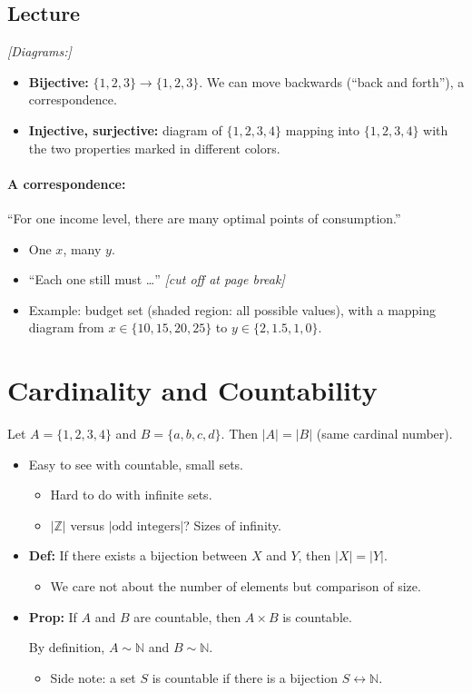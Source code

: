 \documentclass[11pt]{article}
\newcommand{\note}[1]{\textcolor{red!60!black}{\textit{[#1]}}}
\newcommand{\N}{\mathbb{N}}
\newcommand{\Z}{\mathbb{Z}}
\begin{document}
\subsection*{Lecture}
\note{Diagrams:}
\begin{itemize}
  \item \textbf{Bijective:} $\{1,2,3\} \to \{1,2,3\}$. We can move backwards (``back and forth''), a correspondence.
  \item \textbf{Injective, surjective:} diagram of $\{1,2,3,4\}$ mapping into $\{1,2,3,4\}$ with the two properties marked in different colors.
\end{itemize}

\paragraph{A correspondence:} ``For one income level, there are many optimal points of consumption.''
\begin{itemize}
  \item One $x$, many $y$.
  \item ``Each one still must \ldots'' \note{cut off at page break}
  \item Example: budget set (shaded region: all possible values), with a mapping diagram from $x \in \{10, 15, 20, 25\}$ to $y \in \{2, 1.5, 1, 0\}$.
\end{itemize}

\section{Cardinality and Countability}

Let $A = \{1,2,3,4\}$ and $B = \{a,b,c,d\}$. Then $|A| = |B|$ (same cardinal number).

\begin{itemize}
  \item Easy to see with countable, small sets.
  \begin{itemize}
    \item Hard to do with infinite sets.
    \item $|\Z|$ versus $|\text{odd integers}|$? Sizes of infinity.
  \end{itemize}
  \item \textbf{Def:} If there exists a bijection between $X$ and $Y$, then $|X| = |Y|$.
  \begin{itemize}
    \item We care not about the number of elements but comparison of size.
  \end{itemize}
  \item \textbf{Prop:} If $A$ and $B$ are countable, then $A \times B$ is countable.

  By definition, $A \sim \N$ and $B \sim \N$.
  \begin{itemize}
    \item Side note: a set $S$ is countable if there is a bijection $S \leftrightarrow \N$.
  \end{itemize}
\end{itemize}
\end{document}
